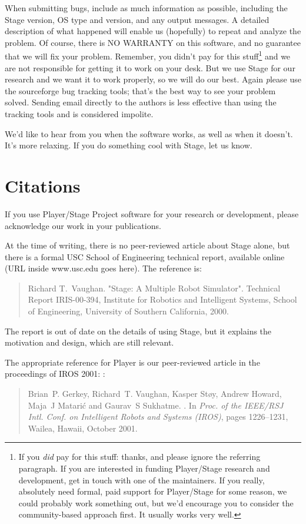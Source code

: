 \documentclass[letter,11pt,twoside]{report}
\begin{document}
When submitting bugs, include as much information as possible,
including the Stage version, OS type and version, and any output
messages.  A detailed description of what happened will enable us
(hopefully) to repeat and analyze the problem.  Of course, there is NO
WARRANTY on this software, and no guarantee that we will fix your
problem.  Remember, you didn't pay for this stuff\footnote{If you {\em
did} pay for this stuff: thanks, and please ignore the referring
paragraph. If you are interested in funding Player/Stage research and
development, get in touch with one of the maintainers. If you really,
absolutely need formal, paid support for Player/Stage for some reason,
we could probably work something out, but we'd encourage you to
consider the community-based approach first. It usually works very
well.} and we are not responsible for getting it to work on your
desk. But we use Stage for our research and we want it to work
properly, so we will do our best. Again {\emph please use the
sourceforge bug tracking tools}; that's the best way to see your
problem solved. Sending email directly to the authors is less
effective than using the tracking tools and is considered impolite.

We'd like to hear from you when the software works, as well as when it
doesn't. It's more relaxing. If you do something cool with Stage, let
us know.

\section{Citations}

If you use Player/Stage Project software for your research or
development, please acknowledge our work in your publications.

At the time of writing, there is no peer-reviewed article about Stage
alone, but there is a formal USC School of Engineering technical
report, available online (URL inside www.usc.edu goes here). The
reference is:

\begin{quote}
  Richard T.~Vaughan. "Stage: A Multiple Robot Simulator". Technical Report IRIS-00-394, Institute for Robotics and Intelligent Systems, School of Engineering, University of Southern California, 2000.
\end{quote}

The report is out of date on the details of using Stage, but it
explains the motivation and design, which are still relevant.

The appropriate reference for Player is our peer-reviewed article in
the proceedings of IROS 2001: \cite{GerkeyVaughan01a}:
\begin{quote}
  Brian~P. Gerkey, Richard~T. Vaughan, Kasper St\o{}y, Andrew Howard,
  Maja~J Matari\'c and Gaurav~S Sukhatme.
  .
  \newblock In {\em Proc. of the IEEE/RSJ Intl. Conf. on Intelligent Robots and
    Systems (IROS)}, pages 1226--1231, Wailea, Hawaii, October 2001.
\end{quote}
\end{document}

